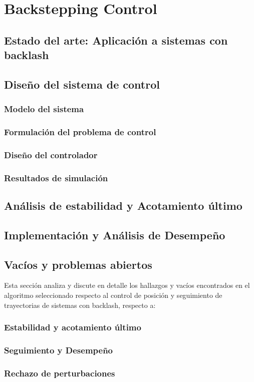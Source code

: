 \cleardoublepage %
\chapter{Backstepping Control}


\section{Estado del arte: Aplicaci\'on a sistemas con backlash}



\section{Dise\~no del sistema de control}

\subsection{Modelo del sistema}
\subsection{Formulaci\'on del problema de control}
\subsection{Dise\~no del controlador}
\subsection{Resultados de simulaci\'on}

\section{An\'alisis de estabilidad y Acotamiento \'ultimo}




\section{Implementaci\'on y An\'alisis de Desempe\~no}


\section{Vac\'ios y problemas abiertos}
Esta secci\'on analiza y discute en detalle los hallazgos y vac\'ios encontrados en el algoritmo seleccionado respecto al control de posici\'on y seguimiento de trayectorias de sistemas con backlash, respecto a:

\subsection{Estabilidad y acotamiento \'ultimo}

\subsection{Seguimiento y Desempe\~no}

\subsection{Rechazo de perturbaciones}

